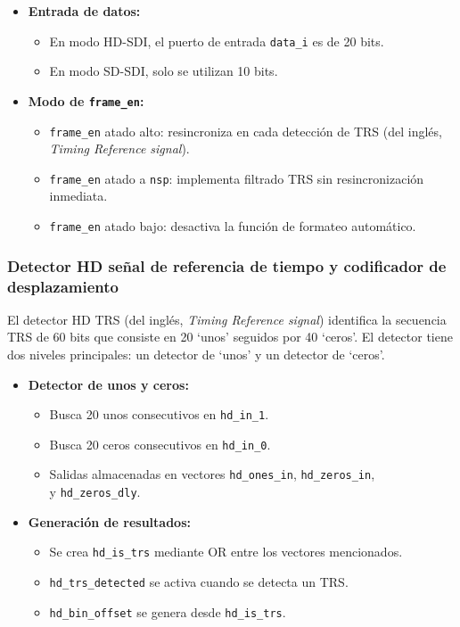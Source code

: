 \begin{itemize}
    \item \textbf{Entrada de datos:}
    \begin{itemize}
        \item En modo HD-SDI, el puerto de entrada \texttt{data\_i} es de 20 bits.
        \item En modo SD-SDI, solo se utilizan 10 bits.
    \end{itemize}
    
    \item \textbf{Modo de \texttt{frame\_en}:}
    \begin{itemize}
        \item \texttt{frame\_en} atado alto: resincroniza en cada detección de TRS  (del inglés, \textit{Timing Reference signal}).
        \item \texttt{frame\_en} atado a \texttt{nsp}: implementa filtrado TRS sin resincronización inmediata.
        \item \texttt{frame\_en} atado bajo: desactiva la función de formateo automático.
    \end{itemize}
\end{itemize}

\subsubsection{Detector HD señal de referencia de tiempo y codificador de desplazamiento}

El detector HD TRS (del inglés, \textit{Timing Reference signal}) identifica la secuencia
TRS de 60 bits que consiste en 20 `unos' seguidos por 40 `ceros'. El detector tiene
dos niveles principales: un detector de `unos' y un detector de `ceros'.

\begin{itemize}
    \item \textbf{Detector de unos y ceros:}
    \begin{itemize}
        \item Busca 20 unos consecutivos en \texttt{hd\_in\_1}.
        \item Busca 20 ceros consecutivos en \texttt{hd\_in\_0}.
        \item Salidas almacenadas en vectores \texttt{hd\_ones\_in}, \texttt{hd\_zeros\_in}, \\
        y \texttt{hd\_zeros\_dly}.
    \end{itemize}
    
    \item \textbf{Generación de resultados:}
    \begin{itemize}
        \item Se crea \texttt{hd\_is\_trs} mediante OR entre los vectores mencionados.
        \item \texttt{hd\_trs\_detected} se activa cuando se detecta un TRS\@.
        \item \texttt{hd\_bin\_offset} se genera desde \texttt{hd\_is\_trs}.
    \end{itemize}
\end{itemize}

